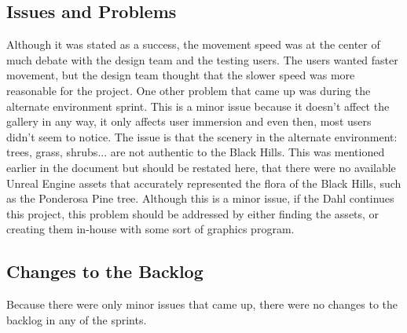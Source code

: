 \subsection{Issues and Problems}
Although it was stated as a success, the movement speed was at the center of much debate with the design team and the testing users.  The users wanted faster movement, but the design team thought that the slower speed was more reasonable for the project.  
One other problem that came up was during the alternate environment sprint.  This is a minor issue because it doesn't affect the gallery in any way, it only affects user immersion and even then, most users didn't seem to notice.  The issue is that the scenery in the alternate environment: trees, grass, shrubs... are not authentic to the Black Hills.  This was mentioned earlier in the document but should be restated here, that there were no available Unreal Engine assets that accurately represented the flora of the Black Hills, such as the Ponderosa Pine tree.  Although this is a minor issue, if the Dahl continues this project, this problem should be addressed by either finding the assets, or creating them in-house with some sort of graphics program.

\subsection{Changes to the Backlog}
Because there were only minor issues that came up, there were no changes to the backlog in any of the sprints.

